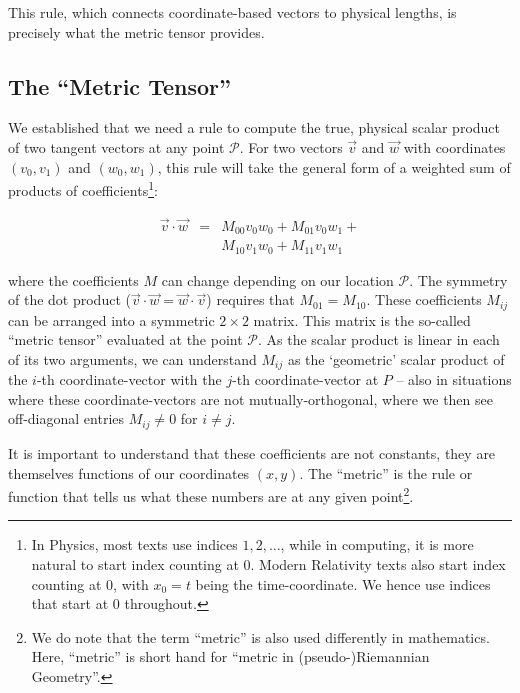 \documentclass[twocolumn]{article}
\begin{document}
This rule, which connects coordinate-based vectors to physical lengths,
is precisely what the metric tensor provides.


\subsection{The ``Metric Tensor''}

We established that we need a rule to compute the true, physical
scalar product of two tangent vectors at any point \(\mathcal P\). For
two vectors
\(\vec{v}\) and \(\vec{w}\) with coordinates \((v_0, v_1)\) and
\((w_0, w_1)\), this rule will take the general form of a
weighted sum of products of coefficients\footnote{
In Physics, most texts use indices $1, 2,\ldots$,
while in computing, it is more natural to start index counting at 0.
Modern Relativity texts also start index counting at 0, with $x_0=t$
being the time-coordinate. We hence use indices that start at
0 throughout.}:

\begin{equation}
\begin{array}{lcl}
\vec{v} \cdot \vec{w}&=&M_{00} v_0 w_0 + M_{01} v_0 w_1 +\\
&&M_{10} v_1 w_0 + M_{11} v_1 w_1
\end{array}
\end{equation}

where the coefficients \(M\) can change depending on our location
\(\mathcal P\).
The symmetry of the dot product (\(\vec{v} \cdot \vec{w} =
\vec{w} \cdot \vec{v}\)) requires that \(M_{01} = M_{10}\). These
coefficients \(M_{ij}\) can be arranged into a symmetric \(2 \times 2\)
matrix. This matrix is the so-called ``metric tensor''
evaluated at the point
\(\mathcal P\). As the scalar product is linear in each of its two arguments,
we can understand $M_{ij}$ as the `geometric' scalar product of the
$i$-th coordinate-vector with the $j$-th coordinate-vector at $P$ --
also in situations where these coordinate-vectors are not
mutually-orthogonal, where we then see off-diagonal entries
$M_{ij}\neq 0$ for $i\neq j$.

It is important to understand that these coefficients are not
constants, they are themselves functions of our coordinates \((x,
y)\).  The ``metric'' is the rule or function that tells us what these
numbers are at any given point\footnote{We do note that the term
``metric'' is also used differently in mathematics. Here, ``metric''
is short hand for ``metric in (pseudo-)Riemannian Geometry''.}.
\end{document}
